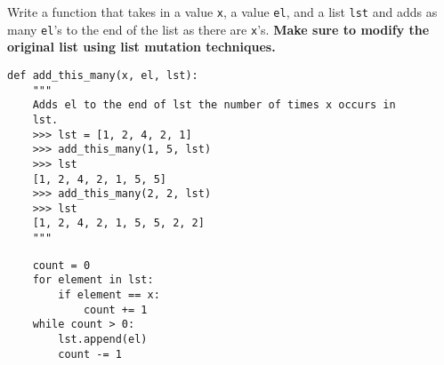 \begin{blocksection}
\question Write a function that takes in a value \lstinline$x$, a value \lstinline$el$, and a list \lstinline$lst$ and adds as many \lstinline$el$’s to the end of the list as there are \lstinline$x$’s. \textbf{Make sure to modify the original list using list mutation techniques.} 

\begin{lstlisting}
def add_this_many(x, el, lst):
    """ 
    Adds el to the end of lst the number of times x occurs in 
    lst.
    >>> lst = [1, 2, 4, 2, 1]
    >>> add_this_many(1, 5, lst)
    >>> lst
    [1, 2, 4, 2, 1, 5, 5]
    >>> add_this_many(2, 2, lst)
    >>> lst
    [1, 2, 4, 2, 1, 5, 5, 2, 2]
    """
\end{lstlisting}
\vspace{.65in}
\begin{solution}[0.75in]
\begin{lstlisting}
    count = 0
    for element in lst:
        if element == x:
            count += 1
    while count > 0:
        lst.append(el)
        count -= 1
\end{lstlisting}
\end{solution}
\end{blocksection}
